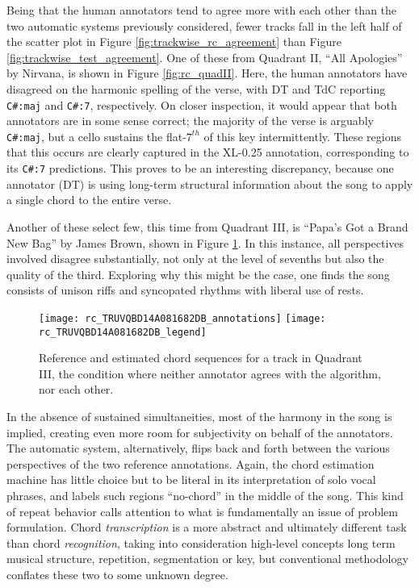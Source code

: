 Being that the human annotators tend to agree more with each other than the two automatic systems previously considered, fewer tracks fall in the left half of the scatter plot in Figure \ref{fig:trackwise_rc_agreement} than Figure \ref{fig:trackwise_test_agreement}.
One of these from Quadrant II, ``All Apologies'' by Nirvana, is shown in Figure \ref{fig:rc_quadII}.
Here, the human annotators have disagreed on the harmonic spelling of the verse, with DT and TdC reporting \texttt{C\#:maj} and \texttt{C\#:7}, respectively.
On closer inspection, it would appear that both annotators are in some sense correct;
the majority of the verse is arguably \texttt{C\#:maj}, but a cello sustains the flat-$7^{th}$ of this key intermittently.
These regions that this occurs are clearly captured in the XL-0.25 annotation, corresponding to its \texttt{C\#:7} predictions.
This proves to be an interesting discrepancy, because one annotator (DT) is using long-term structural information about the song to apply a single chord to the entire verse.

Another of these select few, this time from Quadrant III, is ``Papa's Got a Brand New Bag'' by James Brown, shown in Figure \ref{fig:rc_quadIII}.
In this instance, all perspectives involved disagree substantially, not only at the level of sevenths but also the quality of the third.
Exploring why this might be the case, one finds the song consists of unison riffs and syncopated rhythms with liberal use of rests.
\begin{figure}[t!]
\centering
\texttt{[image: rc\_TRUVQBD14A081682DB\_annotations]}
\texttt{[image: rc\_TRUVQBD14A081682DB\_legend]}
\caption{Reference and estimated chord sequences for a track in Quadrant III, the condition where neither annotator agrees with the algorithm, nor each other.}
\label{fig:rc_quadIII}
\end{figure}
In the absence of sustained simultaneities, most of the harmony in the song is implied, creating even more room for subjectivity on behalf of the annotators.
The automatic system, alternatively, flips back and forth between the various perspectives of the two reference annotations.
Again, the chord estimation machine has little choice but to be literal in its interpretation of solo vocal phrases, and labels such regions ``no-chord'' in the middle of the song.
This kind of repeat behavior calls attention to what is fundamentally an issue of problem formulation.
Chord \emph{transcription} is a more abstract and ultimately different task than chord \emph{recognition}, taking into consideration high-level concepts long term musical structure, repetition, segmentation or key, but conventional methodology conflates these two to some unknown degree.


